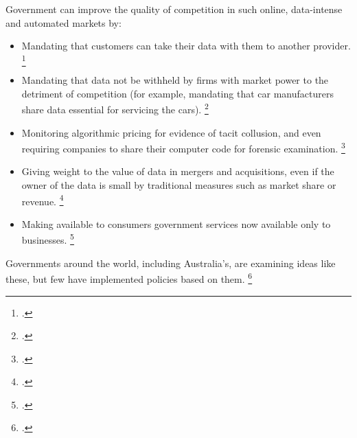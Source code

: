 Government can improve the quality of competition in such online, data-intense and automated markets by: 
\begin{itemize}
\item Mandating that customers can take their data with them to another provider.%
    \footcites{Gruen_portable_2014}{Zingales_portability_2017}{Harford_Facebook_2017}
\item Mandating that data not be withheld by firms with market power to the detriment of competition (for example, mandating that car manufacturers share data essential for servicing the cars).%
    \footcites{Newyorker_algo_2015}{EzrachiVirtual}{EconPricebots2017}
\item Monitoring algorithmic pricing for evidence of tacit collusion, and even requiring companies to share their computer code for forensic examination.%
    \footcites{ACCCNewCarMarketStudyDraft2017}
\item Giving weight to the value of data in mergers and acquisitions, even if the owner of the data is small by traditional measures such as market share or revenue.%
    \footcite{EconData2017}
\item Making available to consumers government services now available only to businesses.%
    \footcites{EconData2017}{Gruen_centralbanking_2014}
\end{itemize}

Governments around the world, including Australia's, are examining ideas like these, but few have implemented policies based on them.%
    \footcites{PC-data-2017}{FT_Japan_competition_2017}{OECD-Algorithm-2017}




